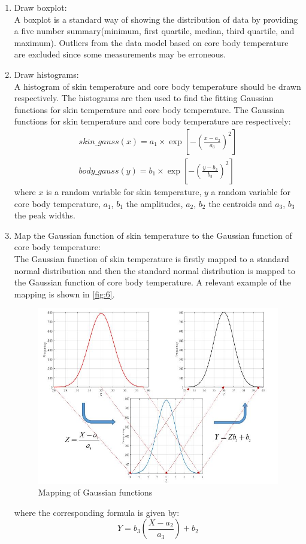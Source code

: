 \begin{enumerate}
	\item Draw boxplot:\\
	A boxplot is a standard way of showing the distribution of data by providing a five number summary(minimum, first quartile, median, third quartile, and maximum). Outliers from the data model based on core body temperature are excluded since some measurements may be erroneous. 
	\item Draw histograms:\\
	A histogram of skin temperature and core body temperature should be drawn respectively. The histograms are then used to find the fitting Gaussian functions for skin temperature and core body temperature. The Gaussian functions for skin temperature and core body temperature are respectively:
	\begin{eqnarray}
		skin\_gauss(x) = a_{1} \times \exp [-(\frac{x-a_{2}}{a_{3}})^2]\\
		body\_gauss(y) = b_{1} \times \exp [-(\frac{y-b_{2}}{b_{3}})^2]
	\end{eqnarray}
	where $x$ is a random variable for skin temperature, $y$ a random variable for core body temperature, $a_{1}$, $b_{1}$ the amplitudes, $a_{2}$, $b_{2}$ the centroids and $a_{3}$, $b_{3}$ the peak widths. 
	\item Map the Gaussian function of skin temperature to the Gaussian function of core body temperature:\\
	The Gaussian function of skin temperature is firstly mapped to a standard normal distribution and then the standard normal distribution is mapped to the Gaussian function of core body temperature. A relevant example of the mapping is shown in \autoref{fig:6}.
	\begin{figure}[H]
		\centering
		\includegraphics[scale=0.5]{img/stats-mapping}
		\caption{Mapping of Gaussian functions \cite{Kwak2019}}
		\label{fig:6}
	\end{figure}
	\noindent
	where the corresponding formula is given by:
	\begin{equation}
		Y = b_{3}(\frac{X - a_{2}}{a_{3}}) + b_{2}
	\end{equation}
\end{enumerate}
